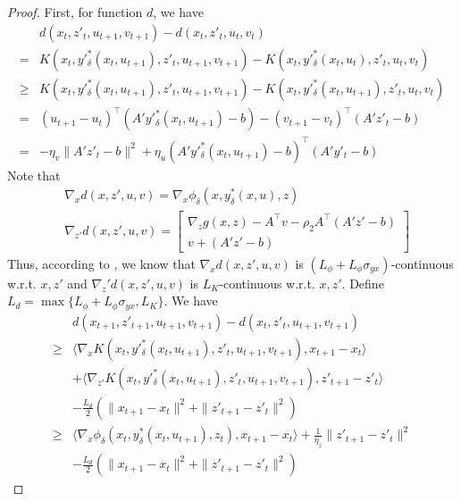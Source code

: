 \documentclass[10pt,a4paper]{amsart}
\begin{document}
\begin{proof}
    
First, for function $d$, we have
\begin{align*}
    &d(x_t, z'_t, u_{t+1}, v_{t+1})-d(x_t, z'_t, u_t, v_t)\\
    =&K(x_t, y'^*_\delta(x_t, u_{t+1}), z'_t, u_{t+1}, v_{t+1})-K(x_t,y'^*_\delta(x_t, u_{t}), z'_t, u_t, v_t)\\
    \geq&K(x_t, y'^*_\delta(x_t, u_{t+1}), z'_t, u_{t+1}, v_{t+1})-K(x_t,y'^*_\delta(x_t, u_{t+1}), z'_t, u_t, v_t)\\
    =& (u_{t+1}-u_t)^\top(A'y'^*_\delta(x_t,u_{t+1})-b)-(v_{t+1}-v_t)^\top(A'z'_t-b)\\
    =&-\eta_v\|A'z'_t-b\|^2+\eta_u(A'y'^*_\delta(x_t,u_{t+1})-b)^\top(A'y'_t-b)
\end{align*}
Note that
\begin{align*}
    &\nabla_x d(x, z',u,v)=\nabla_x \phi_\delta(x, y^*_\delta(x, u), z)\\
    &\nabla_{z'} d(x, z',u,v)=\begin{bmatrix}
    \nabla_z g(x,z)-A^\top v-\rho_2A^\top (A'z'-b)\\
    v+(A'z'-b)
    \end{bmatrix}
\end{align*}
Thus, according to , we know that
$\nabla_x d(x, z',u,v)$ is $(L_\phi+L_\phi\sigma_{yx})$-continuous w.r.t. $x,z'$ and $\nabla_z' d(x, z',u,v)$ is $L_K$-continuous w.r.t. $x,z'$. Define $L_d=\max\{L_\phi+L_\phi\sigma_{yx}, L_K\}$. We have
\begin{align*}
    &d(x_{t+1}, z'_{t+1}, u_{t+1}, v_{t+1})-d(x_t,z'_t, u_{t+1}, v_{t+1})\\
    \geq&\langle\nabla_x K(x_t, y'^*_\delta(x_t,u_{t+1}), z'_t, u_{t+1}, v_{t+1}), x_{t+1}-x_t\rangle\\
    &+\langle\nabla_{z'} K(x_t, y'^*_\delta(x_t,u_{t+1}), z'_t, u_{t+1},v_{t+1}), z'_{t+1}-z'_t\rangle\\
    &-\frac{L_d}{2}(\|x_{t+1}-x_t\|^2+\|z'_{t+1}-z'_t\|^2)\\
    \geq&\langle\nabla_x \phi_\delta(x_t, y_\delta^*(x_t,u_{t+1}), z_t), x_{t+1}-x_t\rangle+\frac{1}{\eta_z}\|z'_{t+1}-z'_t\|^2\\
    &-\frac{L_d}{2}(\|x_{t+1}-x_t\|^2+\|z'_{t+1}-z'_t\|^2)
\end{align*}


\end{proof}
\end{document}
